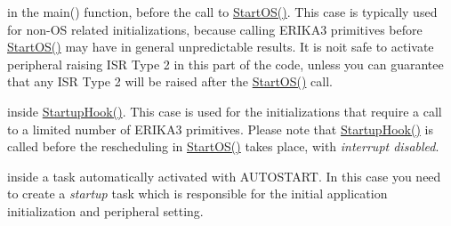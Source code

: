 \begin{DoxyItemize}
\item in the main() function, before the call to \mbox{\hyperlink{group__primitives-startup_ga5fb8a3c5837da7854c4da9972cefda96}{Start\+O\+S()}}. This case is typically used for non-\/\+OS related initializations, because calling E\+R\+I\+K\+A3 primitives before \mbox{\hyperlink{group__primitives-startup_ga5fb8a3c5837da7854c4da9972cefda96}{Start\+O\+S()}} may have in general unpredictable results. It is noit safe to activate peripheral raising I\+SR Type 2 in this part of the code, unless you can guarantee that any I\+SR Type 2 will be raised after the \mbox{\hyperlink{group__primitives-startup_ga5fb8a3c5837da7854c4da9972cefda96}{Start\+O\+S()}} call.
\item inside \mbox{\hyperlink{group__primitives-hook_ga5cb66285b5a4c562ec9c47bd9f7eb2b6}{Startup\+Hook()}}. This case is used for the initializations that require a call to a limited number of E\+R\+I\+K\+A3 primitives. Please note that \mbox{\hyperlink{group__primitives-hook_ga5cb66285b5a4c562ec9c47bd9f7eb2b6}{Startup\+Hook()}} is called before the rescheduling in \mbox{\hyperlink{group__primitives-startup_ga5fb8a3c5837da7854c4da9972cefda96}{Start\+O\+S()}} takes place, with {\itshape interrupt disabled}.
\item inside a task automatically activated with A\+U\+T\+O\+S\+T\+A\+RT. In this case you need to create a {\itshape startup} task which is responsible for the initial application initialization and peripheral setting. 
\end{DoxyItemize}